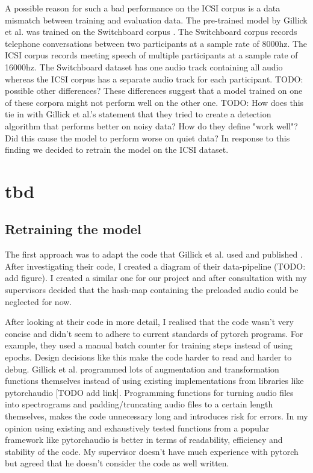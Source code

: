\documentclass[bsc,frontabs,parskip,deptreport]{infthesis}
\begin{document}
A possible reason for such a bad performance on the ICSI corpus is a data mismatch between training and evaluation data. The pre-trained model by Gillick et al. \citep{gillick2021robust} was trained on the Switchboard corpus \citep{switchboard-corpus}. The Switchboard corpus records telephone conversations between two participants at a sample rate of 8000hz. The ICSI corpus records meeting speech of multiple participants at a sample rate of 16000hz. The Switchboard dataset has one audio track containing all audio whereas the ICSI corpus has a separate audio track for each participant.  
TODO: possible other differences?
These differences suggest that a model trained on one of these corpora might not perform well on the other one. 
TODO: How does this tie in with Gillick et al.'s statement that they tried to create a detection algorithm that performs better on noisy data? How do they define "work well"? Did this cause the model to perform worse on quiet data?
In response to this finding we decided to retrain the model on the ICSI dataset. 

\chapter{tbd}
\section{Retraining the model}
The first approach was to adapt the code that Gillick et al. used and published \citep{gillick-codebase}. After investigating their code, I created a diagram of their data-pipeline (TODO: add figure). 
I created a similar one for our project and after consultation with my supervisors decided that the hash-map containing the preloaded audio could be neglected for now. 

After looking at their code in more detail,  
I realised that the code wasn't very concise and didn't seem to adhere to current standards of pytorch programs. 
For example, they used a manual batch counter for training steps instead of using epochs.  
Design decisions like this make the code harder to read and harder to debug. 
Gillick et al. programmed lots of augmentation and transformation functions themselves instead of using existing implementations from libraries like pytorchaudio [TODO add link]. 
Programming functions for turning audio files into spectrograms and padding/truncating audio files to a certain length themselves, makes the code unnecessary long and introduces risk for errors. In my opinion using existing and exhaustively tested functions from a popular framework like pytorchaudio is better in terms of readability, efficiency and stability of the code.
My supervisor doesn't have much experience with pytorch but agreed that he doesn't consider the code as well written.
\end{document}
